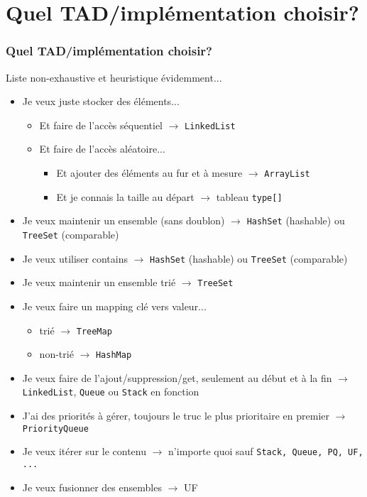 \documentclass[8pt,aspectratio=169]{beamer}
\begin{document}
\section{Quel TAD/implémentation choisir?}

\begin{frame}
\frametitle{Quel TAD/implémentation choisir?}
\color{red} Liste non-exhaustive et heuristique évidemment...
\begin{itemize}
	\item Je veux juste stocker des éléments...
		\begin{itemize}
			\item Et faire de l'accès séquentiel $\rightarrow$ \texttt{LinkedList}
			\item Et faire de l'accès aléatoire...
				\begin{itemize}
					\item Et ajouter des éléments au fur et à mesure $\rightarrow$ \texttt{ArrayList}
					\item Et je connais la taille au départ $\rightarrow$ tableau \texttt{type[]}
				\end{itemize}
		\end{itemize}
	\item Je veux maintenir un ensemble (sans doublon) $\rightarrow$ \texttt{HashSet} (hashable) ou \texttt{TreeSet} (comparable)
	\item Je veux utiliser contains $\rightarrow$ \texttt{HashSet} (hashable) ou \texttt{TreeSet} (comparable)
	\item Je veux maintenir un ensemble trié $\rightarrow$ \texttt{TreeSet}
	\item Je veux faire un mapping clé vers valeur...
		\begin{itemize}
			\item trié $\rightarrow$ \texttt{TreeMap}
			\item non-trié $\rightarrow$ \texttt{HashMap}
		\end{itemize}
	\item Je veux faire de l'ajout/suppression/get, seulement au début et à la fin $\rightarrow$ \texttt{LinkedList}, \texttt{Queue} ou \texttt{Stack} en fonction
	\item J'ai des priorités à gérer, toujours le truc le plus prioritaire en premier $\rightarrow$ \texttt{PriorityQueue}
	\item Je veux itérer sur le contenu $\rightarrow$ n'importe quoi sauf \texttt{Stack, Queue, PQ, UF, ...}
	\item Je veux fusionner des ensembles $\rightarrow$ UF
\end{itemize}
\end{frame}
\end{document}

